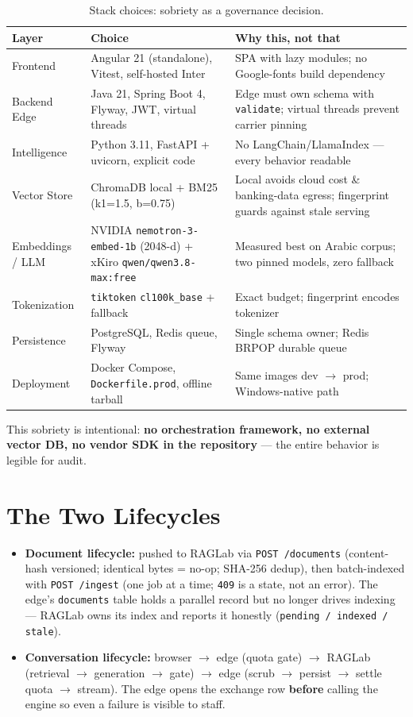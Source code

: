 \documentclass[a4paper,12pt]{report}
\begin{document}
\begin{table}[H]
\centering\footnotesize
\begin{tabular}{p{3.0cm}p{5.2cm}p{5.8cm}}
\toprule
\textbf{Layer} & \textbf{Choice} & \textbf{Why this, not that} \\
\midrule
Frontend & Angular 21 (standalone), Vitest, self-hosted Inter & SPA with lazy modules; no Google-fonts build dependency \\
Backend Edge & Java 21, Spring Boot 4, Flyway, JWT, virtual threads & Edge must own schema with \texttt{validate}; virtual threads prevent carrier pinning \\
Intelligence & Python 3.11, FastAPI + uvicorn, explicit code & No LangChain/LlamaIndex --- every behavior readable \\
Vector Store & ChromaDB local + BM25 (k1=1.5, b=0.75) & Local avoids cloud cost \& banking-data egress; fingerprint guards against stale serving \\
Embeddings / LLM & NVIDIA \texttt{nemotron-3-embed-1b} (2048-d) + xKiro \texttt{qwen/qwen3.8-max:free} & Measured best on Arabic corpus; two pinned models, zero fallback \\
Tokenization & \texttt{tiktoken} \texttt{cl100k\_base} + fallback & Exact budget; fingerprint encodes tokenizer \\
Persistence & PostgreSQL, Redis queue, Flyway & Single schema owner; Redis BRPOP durable queue \\
Deployment & Docker Compose, \texttt{Dockerfile.prod}, offline tarball & Same images dev $\rightarrow$ prod; Windows-native path \\
\bottomrule
\end{tabular}
\caption{Stack choices: sobriety as a governance decision.}
\end{table}

This sobriety is intentional: \textbf{no orchestration framework, no external vector DB, no vendor SDK in the repository} --- the entire behavior is legible for audit.

\section{The Two Lifecycles}

\begin{itemize}[leftmargin=1.2cm, itemsep=2pt]
\item \textbf{Document lifecycle:} pushed to RAGLab via \texttt{POST /documents} (content-hash versioned; identical bytes = no-op; SHA-256 dedup), then batch-indexed with \texttt{POST /ingest} (one job at a time; \texttt{409} is a state, not an error). The edge's \texttt{documents} table holds a parallel record but no longer drives indexing --- RAGLab owns its index and reports it honestly (\texttt{pending / indexed / stale}).
\item \textbf{Conversation lifecycle:} browser $\rightarrow$ edge (quota gate) $\rightarrow$ RAGLab (retrieval $\rightarrow$ generation $\rightarrow$ gate) $\rightarrow$ edge (scrub $\rightarrow$ persist $\rightarrow$ settle quota $\rightarrow$ stream). The edge opens the exchange row \textbf{before} calling the engine so even a failure is visible to staff.
\end{itemize}
\end{document}
